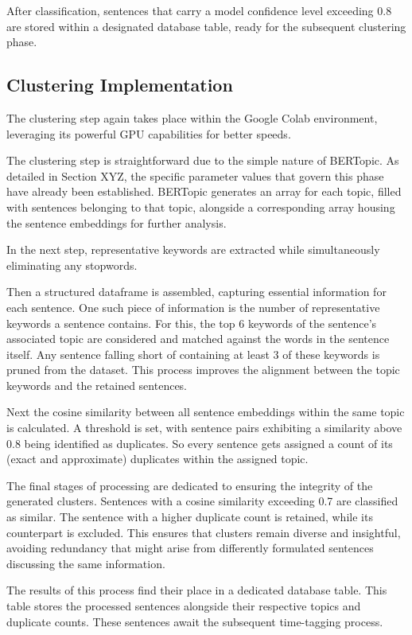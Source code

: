 \documentclass[a4paper,10pt]{report} %
\begin{document}
After classification, sentences that carry a model confidence level exceeding 0.8 are stored within a designated database table, ready for the subsequent clustering phase.

\subsection{Clustering Implementation}
The clustering step again takes place within the Google Colab environment, leveraging its powerful GPU capabilities for better speeds.

The clustering step is straightforward due to the simple nature of BERTopic. As detailed in Section XYZ, the specific parameter values that govern this phase have already been established. BERTopic generates an array for each topic, filled with sentences belonging to that topic, alongside a corresponding array housing the sentence embeddings for further analysis.

In the next step, representative keywords are extracted while simultaneously eliminating any stopwords.

Then a structured dataframe is assembled, capturing essential information for each sentence. One such piece of information is the number of representative keywords a sentence contains. For this, the top 6 keywords of the sentence's associated topic are considered and matched against the words in the sentence itself. Any sentence falling short of containing at least 3 of these keywords is pruned from the dataset. This process improves the alignment between the topic keywords and the retained sentences.

Next the cosine similarity between all sentence embeddings within the same topic is calculated. A threshold is set, with sentence pairs exhibiting a similarity above 0.8 being identified as duplicates. So every sentence gets assigned a count of its (exact and approximate) duplicates within the assigned topic.

The final stages of processing are dedicated to ensuring the integrity of the generated clusters. Sentences with a cosine similarity exceeding 0.7 are classified as similar. The sentence with a higher duplicate count is retained, while its counterpart is excluded. This ensures that clusters remain diverse and insightful, avoiding redundancy that might arise from differently formulated sentences discussing the same information.

The results of this process find their place in a dedicated database table. This table stores the processed sentences alongside their respective topics and duplicate counts. These sentences await the subsequent time-tagging process.
\end{document}
